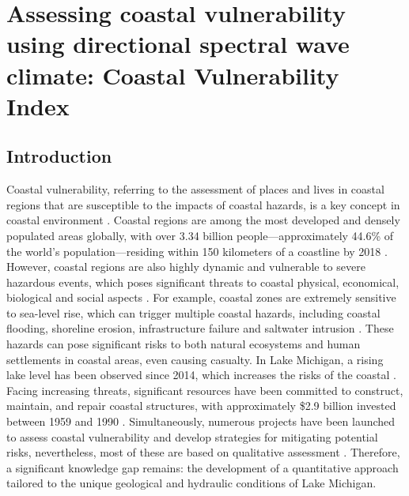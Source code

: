 \chapter{Assessing coastal vulnerability using directional spectral wave
climate: Coastal Vulnerability Index} 
\label{chapter5}


\section{Introduction}
\label{c5_Introduction}

Coastal vulnerability, referring to the assessment of places and lives in
coastal regions that are susceptible to the impacts of coastal hazards, is a key
concept in coastal environment \citep{bevacqua_coastal_2018}. Coastal regions
are among the most developed and densely populated areas globally, with over
3.34 billion people—approximately 44.6\% of the world's population—residing
within 150 kilometers of a coastline by 2018 \citep{cosby_accelerating_2024}.
However, coastal regions are also highly dynamic and vulnerable to severe
hazardous events, which poses significant threats to coastal physical,
economical, biological and social aspects
\citep{bevacqua_coastal_2018,kantamaneni_assessing_2018}. For example, coastal
zones are extremely sensitive to sea-level rise, which can trigger multiple
coastal hazards, including coastal flooding, shoreline erosion, infrastructure
failure and saltwater intrusion \citep{gornitz_global_1991}. These hazards can
pose significant risks to both natural ecosystems and human settlements in
coastal areas, even causing casualty. In Lake Michigan, a rising lake level has
been observed since 2014, which increases the risks of the coastal
\citep{gronewold_hydrological_2016,zoet_analysis_2017,troy_rapid_2021}. Facing
increasing threats, significant resources have been committed to construct,
maintain, and repair coastal structures, with approximately \$2.9 billion
invested between 1959 and 1990 \citep{angel_large-scale_1995}. Simultaneously,
numerous projects have been launched to assess coastal vulnerability and develop
strategies for mitigating potential risks, nevertheless, most of these are based
on qualitative assessment \citep{salus_addressing_2024}. Therefore, a
significant knowledge gap remains: the development of a quantitative approach
tailored to the unique geological and hydraulic conditions of Lake Michigan.

